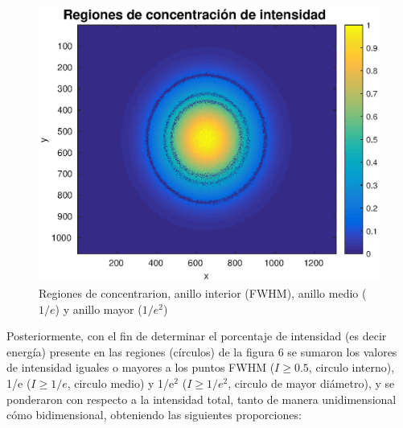\documentclass[11pt,letterpaper,twocolumn]{article}
\begin{document}
\begin{figure}[h!]
\begin{center}
\includegraphics[scale=0.6]{anillos.eps}
\caption{Regiones de concentrarion, anillo interior (FWHM), anillo medio ($1/e$) y anillo mayor ($1/e^{2}$)}
\end{center}
\label{anillos}
\end{figure}
\par 
Posteriormente, con el fin de determinar el porcentaje de intensidad (es decir energía) presente en las regiones (círculos) de la figura $6$ se sumaron los valores de intensidad iguales o mayores a los puntos FWHM ($I \geq 0.5$, circulo interno), 1/e ($I \geq 1/e$, circulo medio) y 1/e$^{2}$ ($I \geq 1/e^{2}$, circulo de mayor diámetro), y se ponderaron con respecto a la intensidad total, tanto de manera unidimensional cómo bidimensional, obteniendo las siguientes proporciones:\\  
\end{document}
